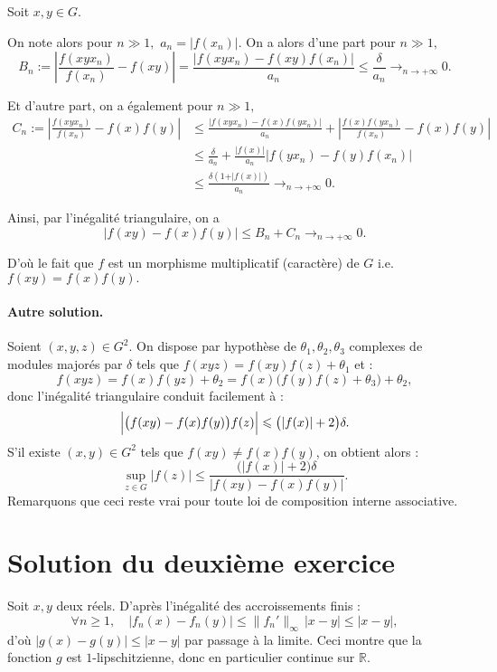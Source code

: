 Soit $x,y\in G.$ 

On note alors pour $n\gg 1,$ $a_{n}=\vert f(x_{n})\vert.$
On a alors d'une part pour $n\gg1,$ $$B_{n}:=\left \vert \frac{f(xyx_{n})}{f(x_{n})}-f(xy) \right\vert =\frac{ \vert f(xyx_{n})-f(xy)f(x_{n}) \vert }{a_{n}}\leq \frac{\delta}{a_{n}}\longrightarrow_{n\rightarrow +\infty} 0.$$

Et d'autre part, on a également pour $n\gg 1,$ 
\begin{align*}
C_{n}:=\left\vert \frac{f(xyx_{n})}{f(x_{n})}-f(x)f(y) \right\vert & \leq \frac{ \vert f(xyx_{n})-f(x)f(yx_{n})\vert }{a_{n}}+ \left\vert \frac{f(x)f(yx_{n})}{f(x_{n})}-f(x)f(y) \right\vert\\
& \leq \frac{\delta}{a_{n}}+ \frac{\vert f(x) \vert }{a_{n}}\vert f(yx_{n})-f(y)f(x_{n})\vert\\
& \leq \frac{\delta(1+\vert f(x) \vert )}{a_{n}}\longrightarrow_{n\rightarrow +\infty} 0.
\end{align*}

Ainsi, par l'inégalité triangulaire, on a $$\vert f(xy)-f(x)f(y)\vert \leq B_{n}+C_{n}\longrightarrow_{n\rightarrow +\infty}0.$$

D'où le fait que $f$ est un morphisme multiplicatif (caractère) de $G$ i.e. $\displaystyle f(xy)=f(x)f(y).$

\paragraph{Autre solution.} %

Soient $(x,y,z) \in G^2$. On dispose par hypothèse de $\theta_1,\theta_2,\theta_3$ complexes de modules majorés par $\delta$ tels que \(f(xyz) = f(xy)f(z) + \theta_1\) et :
\[
f(xyz) = f(x)f(yz) + \theta_2 = f(x)\bigl(f(y)f(z) + \theta_3 \bigr) + \theta_2 ,
\]
donc l'inégalité triangulaire conduit facilement à :
\[
\Bigl|\bigl(f(xy)-f(x)f(y)\bigr)f(z) \Bigr| \leqslant \bigl(|f(x)| + 2\bigr) \delta.
\]
S'il existe $(x,y) \in G^2$ tels que $f(xy)\neq f(x)f(y)$, on obtient alors :
\[
\sup_{z\in G} |f(z)| \leqslant \frac{\bigl(|f(x)|+2\bigr)\delta}{|f(xy)-f(x)f(y)|}.
\]
Remarquons que ceci reste vrai pour toute loi de composition interne associative.



\section{Solution du deuxième exercice} %

Soit $x,y$ deux réels. D'après l'inégalité des accroissements finis :
\[
\forall n \geqslant 1,\quad |f_n(x) - f_n(y)| \leqslant \|f_n'\|_\infty\,|x-y| \leqslant |x-y|,
\]
d'où $|g(x) - g(y)| \leqslant |x-y|$ par passage à la limite. Ceci montre que la fonction $g$ est $1$-lipschitzienne, donc en particulier continue sur $\mathbb R$.

